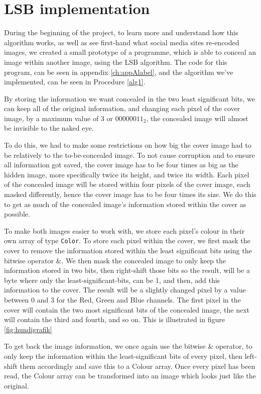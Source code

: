 \section{LSB implementation}
\label{sec:lsb-implementation}
During the beginning of the project, to learn more and understand how this algorithm works, as well as see first-hand what social media sites re-encoded images, we created a small prototype of a programme, which is able to conceal an image within another image, using the LSB algorithm. The code for this program, can be seen in appendix \ref{ch:appAlabel}, and the algorithm we've implemented, can be seen in Procedure \ref{alg1}.

By storing the information we want concealed in the two least significant bits, we can keep all of the original information, and changing each pixel of the cover image, by a maximum value of 3 or $00000011_2$, the concealed image will almost be invisible to the naked eye.

To do this, we had to make some restrictions on how big the cover image had to be relatively to the to-be-concealed image. 
To not cause corruption and to ensure all information got saved, the cover image has to be four times as big as the hidden image, more specifically twice its height, and twice its width. 
Each pixel of the concealed image will be stored within four pixels of the cover image, each masked differently, hence the cover image has to be four times its size. 
We do this to get as much of the concealed image's information stored within the cover as possible.

To make both images easier to work with, we store each pixel's colour in their own array of type \lstinline|Color|.
To store each pixel within the cover, we first mask the cover to remove the information stored within the least significant bits using the bitwise operator \&. 
We then mask the concealed image to only keep the information stored in two bits, then right-shift those bits so the result, will be a byte where only the least-significant-bits, can be 1, and then, add this information to the cover. 
The result will be a slightly changed pixel by a value between 0 and 3 for the Red, Green and Blue channels. 
The first pixel in the cover will contain the two most significant bits of the concealed image, the next will contain the third and fourth, and so on. This is illustrated in figure \ref{fig:hundigrafik}


To get back the image information, we once again use the bitwise \& operator, to only keep the information within the least-significant bits of every pixel, then left-shift them accordingly and save this to a Colour array. Once every pixel has been read, the Colour array can be transformed into an image which looks just like the original.

